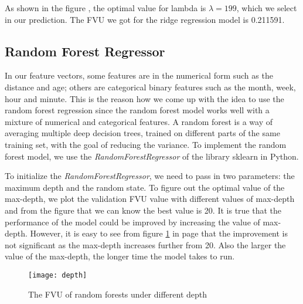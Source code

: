 \par As shown in the figure , the optimal value for lambda is $\lambda = 199$, which we select in our prediction. The FVU we got for the ridge regression model is 0.211591. 

\subsection{Random Forest Regressor}
In our feature vectors, some features are in the numerical form such as the distance and age; others are categorical binary features such as the month, week, hour and minute. This is the reason how we come up with the idea to use the random forest regression since the random forest model works well with a mixture of numerical and categorical features. A random forest  is a way of averaging multiple deep decision trees\cite{brei}, trained on different parts of the same training set, with the goal of reducing the variance\cite{wiki}. To implement the random forest model, we use the \textit{RandomForestRegressor} of the library sklearn in Python. 
\par To initialize the \textit{RandomForestRegressor}, we need to pass in two parameters: the maximum depth and the random state. To figure out the optimal value of the max-depth, we plot the validation FVU value with different values of max-depth and from the figure that we can know the best value is 20. It is true that the performance of the model could be improved by increasing the value of max-depth. However, it is easy to see from figure \ref{fig_dep} in page \pageref{fig_dep} that the improvement is not significant as the max-depth increases further from 20. Also the larger the value of the max-depth, the longer time the model takes to run. 

  \begin{figure}[h!]
  \centering
  \texttt{[image: depth]}
  \caption{The FVU of random forests under different depth}
  \label{fig_dep}
  \end{figure}

